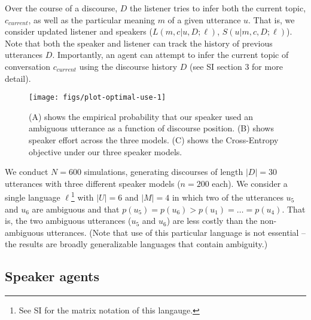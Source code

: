 \documentclass[10pt, letterpaper]{article}
\newenvironment{CodeChunk}{}{}
\begin{document}
Over the course of a discourse, \(D\) the listener tries to infer both
the current topic, \(c_{current}\), as well as the particular meaning
\(m\) of a given utterance \(u\). That is, we consider updated listener
and speakers (\(L(m, c|u,D;\ell)\), \(S(u|m,c,D;\ell)\)). Note that both
the speaker and listener can track the history of previous utterances
\(D\). Importantly, an agent can attempt to infer the current topic of
conversation \(c_{current}\) using the discourse history \(D\) (see SI
section 3 for more detail).\par

\begin{CodeChunk}
\begin{figure*}[h]

{\centering \texttt{[image: figs/plot-optimal-use-1]} 

}

\caption[(A) shows the empirical probability that our speaker used an ambiguous utterance as a function of discourse position]{(A) shows the empirical probability that our speaker used an ambiguous utterance as a function of discourse position. (B) shows speaker effort across the three models. (C) shows the Cross-Entropy objective under our three speaker models.}\label{fig:plot-optimal-use}
\end{figure*}
\end{CodeChunk}

We conduct \(N=600\) simulations, generating discourses of length
\(|D|=30\) utterances with three different speaker models (\(n=200\)
each). We consider a single language
\(\ell\)\footnote{See SI for the matrix notation of this langauge.} with
\(|U|=6\) and \(|M|=4\) in which two of the utterances \(u_5\) and
\(u_6\) are ambiguous and that
\(p(u_5) = p(u_6) > p(u_{1})=\dots=p(u_{4})\). That is, the two
ambiguous utterances (\(u_5\) and \(u_6\)) are less costly than the
non-ambiguous utterances. (Note that use of this particular language is
not essential -- the results are broadly generalizable languages that
contain ambiguity.)\par

\subsection{Speaker agents}\label{speaker-agents}
\end{document}
